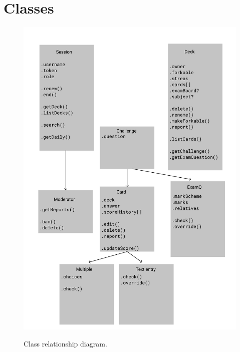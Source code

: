 \documentclass{report}
\begin{document}
\section{Classes}
\begin{figure}[h!]
  \includegraphics[width=\linewidth]{media/classes.png}
  \label{fig:classes1}
  \caption{Class relationship diagram.}
\end{figure}

\printbibliography
\end{document}
